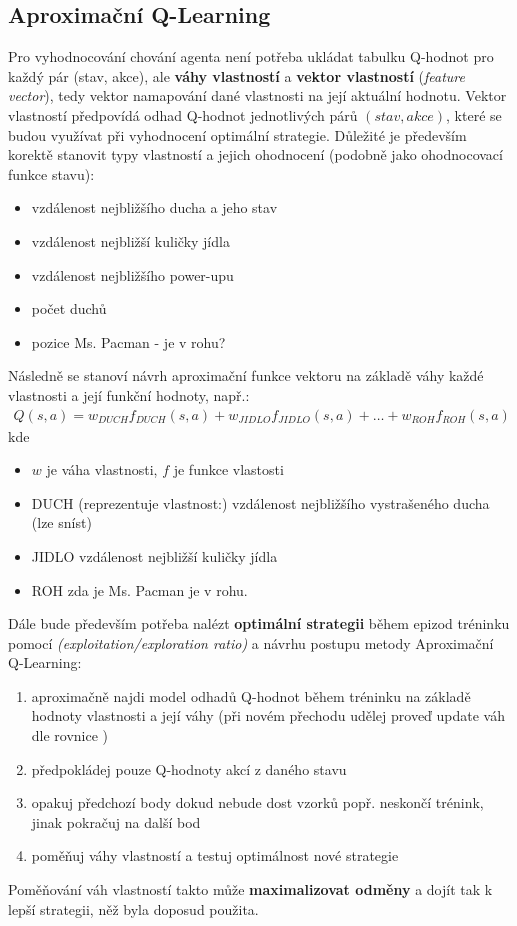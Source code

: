 \subsection{Aproximační Q-Learning}
\label{navrh:approxqlearnagent}
Pro vyhodnocování chování agenta není potřeba ukládat tabulku Q-hodnot pro každý pár (stav, akce), ale \textbf{váhy vlastností} a \textbf{vektor vlastností} (\textit{feature vector}), tedy vektor namapování dané vlastnosti na její aktuální hodnotu.
Vektor vlastností předpovídá odhad Q-hodnot jednotlivých párů $(stav,akce)$, které se budou využívat při vyhodnocení optimální strategie. Důležité je především korektě stanovit typy vlastností a jejich ohodnocení (podobně jako ohodnocovací funkce stavu):
\begin{itemize}
\item vzdálenost nejbližšího ducha a jeho stav
\item vzdálenost nejbližší kuličky jídla
\item vzdálenost nejbližšího power-upu
\item počet duchů
\item pozice Ms. Pacman - je v rohu?
\end{itemize}
Následně se stanoví návrh aproximační funkce vektoru na základě váhy každé vlastnosti a její funkční hodnoty, např.:
\begin{align}
Q(s,a) = w_{DUCH}f_{DUCH}(s,a) + w_{JIDLO}f_{JIDLO}(s,a) + \dots + w_{ROH}f_{ROH}(s,a)
\end{align}
kde 
\begin{itemize}
  \item $w$ je váha vlastnosti, $f$ je funkce vlastosti
  \item DUCH (reprezentuje vlastnost:) vzdálenost nejbližšího vystrašeného ducha (lze sníst)
  \item JIDLO vzdálenost nejbližší kuličky jídla
  \item ROH zda je Ms. Pacman je v rohu.
\end{itemize}

Dále bude především potřeba nalézt \textbf{optimální strategii} během epizod tréninku pomocí \textit{(exploitation/exploration ratio)} a návrhu postupu metody Aproximační Q-Learning:
\begin{enumerate}
\item aproximačně najdi model odhadů Q-hodnot během tréninku na základě hodnoty vlastnosti a její váhy (při novém přechodu udělej proveď update váh dle rovnice \label{rov:approxq3})
\item předpokládej pouze Q-hodnoty akcí z daného stavu
\item opakuj předchozí body dokud nebude dost vzorků popř. neskončí trénink, jinak pokračuj na další bod
\item poměňuj váhy vlastností a testuj optimálnost nové strategie
\end{enumerate}
Poměňování váh vlastností takto může \textbf{maximalizovat odměny} a dojít tak k lepší strategii, něž byla doposud použita.

